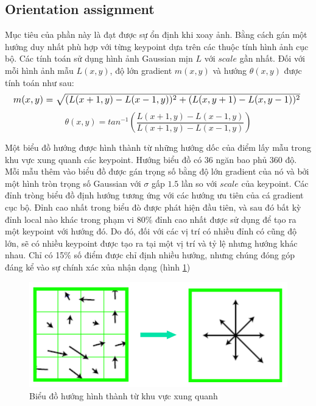 \documentclass[conference]{IEEEtran}
\begin{document}
\subsection{Orientation assignment}
Mục tiêu của phần này là đạt được sự ổn định khi xoay ảnh. Bằng cách gán một hướng duy nhất phù hợp với từng keypoint dựa trên các thuộc tính hình ảnh cục bộ. Các tính toán sử dụng hình ảnh Gaussian mịn $L$ với $scale$ gần nhất. Đối với mỗi hình ảnh mẫu $L(x, y)$, độ lớn gradient $m(x, y)$ và hướng $\theta (x, y)$ được tính toán như sau:
\begin{equation}
\resizebox{1\hsize}{!}{$
m(x,y) = \sqrt{(L(x+1,y) - L(x-1,y))^2 +
 (L(x,y+1)-L(x,y-1))^2}
 $
}%
\end{equation}
\begin{equation}
\theta(x,y) = tan^{-1}(\frac{L(x+1,y) - L(x-1,y)}{L(x+1,y) - L(x-1,y)})
\end{equation}

Một biểu đồ hướng được hình thành từ những hướng dốc của điểm lấy mẫu trong khu vực xung quanh các keypoint. Hướng biểu đồ có 36 ngăn bao phủ $360$ độ. Mỗi mẫu thêm vào biểu đồ được gán trọng số bằng độ lớn gradient của nó và bởi một hình tròn trọng số Gaussian với $\sigma$ gấp $1.5$ lần so với $scale$ của keypoint.
    Các đỉnh tròng biểu đồ định hướng tương ứng với các hướng ưu tiên của cá gradient cục bộ. Đỉnh cao nhất trong biểu đò được phát hiện đầu tiên, và sau đó bất kỳ đỉnh local nào khác trong phạm vi 80$\%$ đỉnh cao nhất được sử dụng để tạo ra một keypoint với hướng đó. Do đó, đối với các vị trí có nhiều đỉnh có cũng độ lớn, sẽ có nhiều keypoint được tạo ra tại một vị trí và tỷ lệ nhưng hướng khác nhau. Chỉ có 15$\%$ số điểm được chỉ định nhiều hướng, nhưng chúng đóng góp đáng kể vào sự chính xác xủa nhận dạng (hình \ref{fig:bieudohuong_tinh})
    
\begin{figure}
  \includegraphics[width=\linewidth]{bieudohuong_tinh}
  \caption{Biểu đồ hướng hình thành từ khu vực xung quanh}
  \label{fig:bieudohuong_tinh}
\end{figure}
\end{document}

